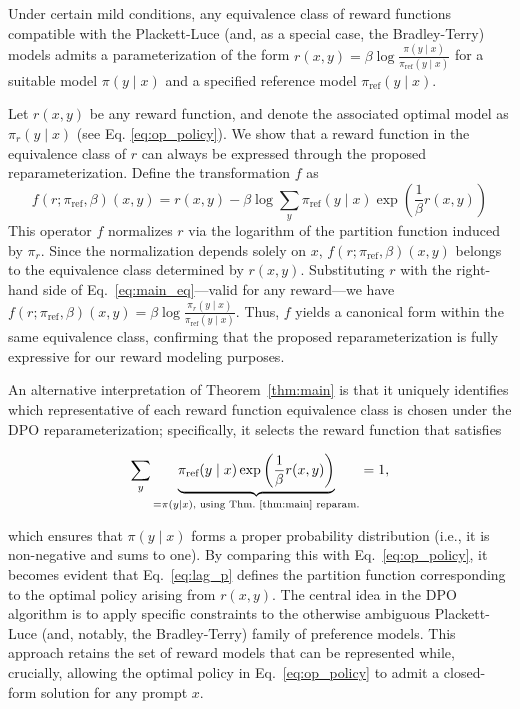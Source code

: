\begin{theorem}\label{thm:main}
    Under certain mild conditions, any equivalence class of reward functions compatible with the Plackett-Luce (and, as a special case, the Bradley-Terry) models admits a parameterization of the form ${r(x, y) = \beta \log \frac{\pi(y\mid x)}{\pi_\text{ref}(y\mid x)}}$ for a suitable model $\pi(y\mid x)$ and a specified reference model $\pi_\text{ref}(y \mid x)$.
\end{theorem}

\begin{sproof}
    Let $r(x, y)$ be any reward function, and denote the associated optimal model as $\pi_r(y \mid x)$ (see Eq. \ref{eq:op_policy}). We show that a reward function in the equivalence class of $r$ can always be expressed through the proposed reparameterization. Define the transformation $f$ as
\begin{equation}
    f(r; \pi_\text{ref}, \beta)(x, y) = r(x, y) - \beta\log\sum_{y}\pi_\text{ref}(y\mid x)\exp\left(\frac{1}{\beta}r(x, y)\right)
\end{equation}
This operator $f$ normalizes $r$ via the logarithm of the partition function induced by $\pi_r$. Since the normalization depends solely on $x$, $f(r; \pi_\text{ref}, \beta)(x, y)$ belongs to the equivalence class determined by $r(x, y)$. Substituting $r$ with the right-hand side of Eq.~\ref{eq:main_eq}—valid for any reward—we have $f(r; \pi_\text{ref}, \beta)(x, y) = \beta \log \frac{\pi_r(y\mid x)}{\pi_\text{ref}(y\mid x)}$. Thus, $f$ yields a canonical form within the same equivalence class, confirming that the proposed reparameterization is fully expressive for our reward modeling purposes.
\end{sproof}

An alternative interpretation of Theorem~\ref{thm:main} is that it uniquely identifies which representative of each reward function equivalence class is chosen under the DPO reparameterization; specifically, it selects the reward function that satisfies

\begin{equation}\label{eq:lag_p}
     \sum_{y}\underbrace{\pi_\text{ref}(y\mid x)\exp\left(\frac{1}{\beta}r(x, y)\right)}_{=\pi(y\mid x)\text{, using Thm.~\ref{thm:main} reparam.}} = 1,
\end{equation}

which ensures that $\pi(y\mid x)$ forms a proper probability distribution (i.e., it is non-negative and sums to one). By comparing this with Eq.~\ref{eq:op_policy}, it becomes evident that Eq.~\ref{eq:lag_p} defines the partition function corresponding to the optimal policy arising from $r(x, y)$. The central idea in the DPO algorithm is to apply specific constraints to the otherwise ambiguous Plackett-Luce (and, notably, the Bradley-Terry) family of preference models. This approach retains the set of reward models that can be represented while, crucially, allowing the optimal policy in Eq.~\ref{eq:op_policy} to admit a closed-form solution for any prompt $x$.

